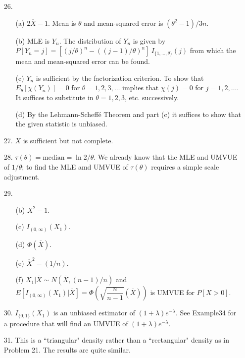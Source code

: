 \begin{enumerate}
	 \item[26.] \begin{enumerate}
	 	\item[(a)] $2\overline{X}-1$. Mean is $\theta$ and mean-squared error is $(\theta^2-1)/3n$.
	 	\item[(b)] MLE is $Y_n$. The distribution of $Y_n$ is given by $P[Y_n=j] = [(j/\theta)^n - ((j-1)/\theta)^n]\ I_{\{1,\ldots,\theta\}}(j)$ from which the mean and mean-squared error can be found.
	 	\item[(c)] $Y_n$ is sufficient by the factorization criterion. To show that $E_\theta[\chi(Y_n)] = 0$ for $\theta = 1, 2, 3, \ldots$ implies that $\chi(j)=0$ for $j=1,2,\ldots$. It suffices to substitute in $\theta = 1, 2, 3$, etc. successively.
	 	\item[(d)] By the Lehmann-Scheff\'e Theorem and part (c) it suffices to show that the given statistic is unbiased.
	 \end{enumerate}
 
 	\item[27.] $X$ is sufficient but not complete.

	\item[28.] $\tau(\theta) = \mbox{median} = \ln 2/\theta$. We already know that the MLE and UMVUE of $1/\theta$; to find the MLE amd UMVUE of $\tau(\theta)$ requires a simple scale adjustment.	  
	  
	\item[29.] \begin{enumerate}
		\item[(b)] $X^2 - 1$.
		\item[(c)] $I_{(0,\infty)}(X_1)$.
		
		\newpage
		
		\item[(d)] $\Phi(\overline{X})$.
		\item[(e)] $\overline{X}^2 - (1/n)$.
		\item[(f)] $X_1\vert\overline{X} \sim N(\overline{X},(n-1)/n)$ and $E[I_{(0,\infty)}(X_1)\vert \overline{X}] = \Phi\left(\sqrt{\dfrac{n}{n-1}}(\overline{X})\right)$ is UMVUE for $P[X>0]$.
	\end{enumerate} 
	  
	\item[30.] $I_{\{0,1\}}(X_1)$ is an unbiased estimator of $(1+\lambda)e^{-\lambda}$.  See Example34 for a procedure that will find an UMVUE of $(1+\lambda)e^{-\lambda}$.
	
	\item[31.] This is a ``triangular" density rather than a ``rectangular" density as in Problem 21.  The results are quite similar.  
	  

\end{enumerate}
